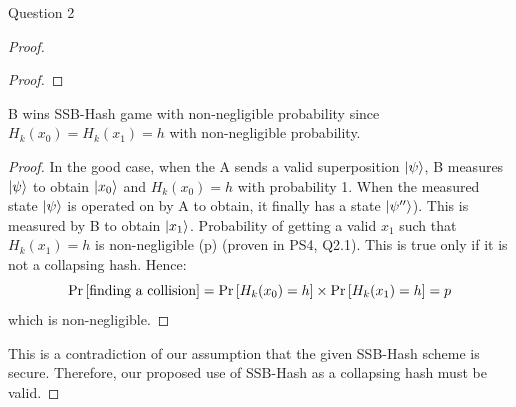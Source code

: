 \begin{solution}{Question 2}
\begin{proof}
\begin{proof}
    \end{proof}
    \begin{claim}
        B wins SSB-Hash game with non-negligible probability since $H_k(x_0) = H_k(x_1) = h$ with non-negligible probability.
    \end{claim}
    \begin{proof}
        In the good case, when the A sends a valid superposition $\ket{\psi}$, B measures $\ket{\psi}$ to obtain $\ket{x_0}$ and $H_k(x_0) = h$ with probability 1. When the measured state $\ket{\psi}$ is operated on by A to obtain, it finally has a state $\ket{\psi''}$). This is measured by B to obtain $\ket{x_1}$. Probability of getting a valid $x_1$ such that $H_k(x_1) = h$ is non-negligible (p) (proven in PS4, Q2.1). This is true only if it is not a collapsing hash. Hence:
        \[\Pr\left[ \text{finding a collision} \right] = \Pr\left[ H_k(x_0) = h \right]\times \Pr\left[ H_k(x_1) = h \right] = p\]
        which is non-negligible.
    \end{proof}
    This is a contradiction of our assumption that the given SSB-Hash scheme is secure. Therefore, our proposed use of SSB-Hash as a collapsing hash must be valid.
    
    
    \end{proof}
\end{solution}
 
